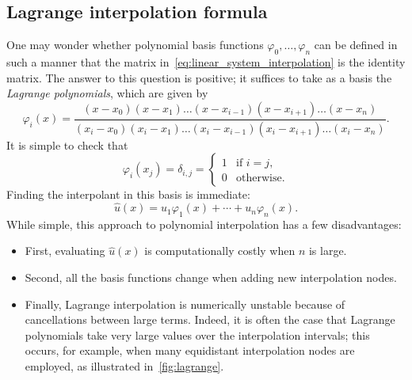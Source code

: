 \subsection{Lagrange interpolation formula}
One may wonder whether polynomial basis functions $\varphi_0, \dotsc, \varphi_n$ can be defined in such a manner that
the matrix in~\eqref{eq:linear_system_interpolation} is the identity matrix.
The answer to this question is positive;
it suffices to take as a basis the \emph{Lagrange polynomials},
which are given by
\[
    \varphi_{i}(x)
    = \frac{(x - x_0) (x - x_1) \dotsc (x - x_{i-1}) (x - x_{i+1}) \dotsc (x - x_n)}
    {(x_i - x_0) (x_i - x_1) \dotsc (x_i - x_{i-1}) (x_i - x_{i+1}) \dotsc (x_i - x_n)}.
\]
It is simple to check that
\[
    \varphi_i(x_j) =
    \delta_{i,j} =
    \begin{cases}
        1 & \text{if $i = j$}, \\
        0 & \text{otherwise.}
    \end{cases}
\]
Finding the interpolant in this basis is immediate:
\[
    \widehat u(x) = u_1 \varphi_1(x) + \dotsb + u_n \varphi_n(x).
\]
While simple, this approach to polynomial interpolation has a few disadvantages:
\begin{itemize}
    \item
        First, evaluating $\widehat u(x)$ is computationally costly when $n$ is large.

    \item
        Second, all the basis functions change when adding new interpolation nodes.

    \item
        Finally, Lagrange interpolation is numerically unstable because of cancellations between large terms.
        Indeed, it is often the case that Lagrange polynomials take very large values over the interpolation intervals;
        this occurs, for example,
        when many equidistant interpolation nodes are employed,
        as illustrated in~\cref{fig:lagrange}.
\end{itemize}
